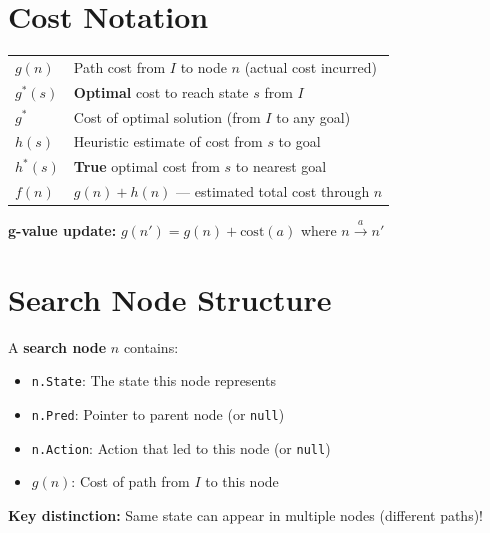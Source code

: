 \documentclass[11pt,a4paper]{article}
\begin{document}
\section{Cost Notation}

\begin{definitionbox}
\begin{tabular}{@{}ll@{}}
$g(n)$ & Path cost from $I$ to node $n$ (actual cost incurred) \\
$g^*(s)$ & \textbf{Optimal} cost to reach state $s$ from $I$ \\
$g^*$ & Cost of optimal solution (from $I$ to any goal) \\
$h(s)$ & Heuristic estimate of cost from $s$ to goal \\
$h^*(s)$ & \textbf{True} optimal cost from $s$ to nearest goal \\
$f(n)$ & $g(n) + h(n)$ --- estimated total cost through $n$ \\
\end{tabular}

\textbf{g-value update:} $g(n') = g(n) + \text{cost}(a)$ where $n \xrightarrow{a} n'$
\end{definitionbox}

\section{Search Node Structure}

\begin{definitionbox}
A \textbf{search node} $n$ contains:
\begin{itemize}[leftmargin=*,nosep]
\item \texttt{n.State}: The state this node represents
\item \texttt{n.Pred}: Pointer to parent node (or \texttt{null})
\item \texttt{n.Action}: Action that led to this node (or \texttt{null})
\item $g(n)$: Cost of path from $I$ to this node
\end{itemize}

\textbf{Key distinction:} Same state can appear in multiple nodes (different paths)!
\end{definitionbox}
\end{document}
